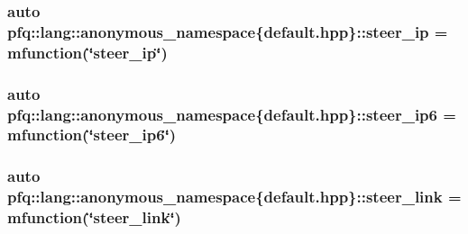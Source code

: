 \hypertarget{namespacepfq_1_1lang_1_1anonymous__namespace_02default_8hpp_03_afe1c69c555a75021f7e637086cb1264c}{
\subsubsection[{steer\+\_\+ip}]{\setlength{\rightskip}{0pt plus 5cm}auto pfq\+::lang\+::anonymous\+\_\+namespace\{default.\+hpp\}\+::steer\+\_\+ip = {\bf mfunction}(\char`\"{}steer\+\_\+ip\char`\"{})}}\label{namespacepfq_1_1lang_1_1anonymous__namespace_02default_8hpp_03_afe1c69c555a75021f7e637086cb1264c}
\hypertarget{namespacepfq_1_1lang_1_1anonymous__namespace_02default_8hpp_03_a02291b124a4aa900d78797e386517f69}{
\subsubsection[{steer\+\_\+ip6}]{\setlength{\rightskip}{0pt plus 5cm}auto pfq\+::lang\+::anonymous\+\_\+namespace\{default.\+hpp\}\+::steer\+\_\+ip6 = {\bf mfunction}(\char`\"{}steer\+\_\+ip6\char`\"{})}}\label{namespacepfq_1_1lang_1_1anonymous__namespace_02default_8hpp_03_a02291b124a4aa900d78797e386517f69}
\hypertarget{namespacepfq_1_1lang_1_1anonymous__namespace_02default_8hpp_03_ac1f3f9a2caf886a1441e62860a4ca058}{
\subsubsection[{steer\+\_\+link}]{\setlength{\rightskip}{0pt plus 5cm}auto pfq\+::lang\+::anonymous\+\_\+namespace\{default.\+hpp\}\+::steer\+\_\+link = {\bf mfunction}(\char`\"{}steer\+\_\+link\char`\"{})}}\label{namespacepfq_1_1lang_1_1anonymous__namespace_02default_8hpp_03_ac1f3f9a2caf886a1441e62860a4ca058}
